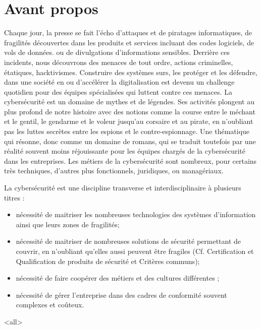 
\section{Avant propos }

Chaque jour, la presse se fait l'écho d'attaques et de piratages informatiques, de fragilités découvertes dans les produits et services incluant des codes logiciels, de vols de données. ou de divulgations d'informations sensibles.
Derrière ces incidents, nous découvrons des menaces de tout ordre, actions criminelles, étatiques, hacktivismes. Construire des systèmes surs, les protéger et les défendre, dans une société en ou d'accélérer la digitalisation est devenu un challenge quotidien pour des équipes spécialisées qui luttent contre ces menaces. 
La cybersécurité est un domaine de mythes et de légendes. Ses activités plongent au plus profond de notre histoire avec des notions comme la course entre le méchant et le gentil, le gendarme et le voleur jusqu'au corsaire et au pirate, en n'oubliant pas les luttes secrètes entre les espions et le contre-espionnage. Une thématique qui résonne, donc comme un domaine de romans, qui se traduit toutefois par une réalité souvent moins réjouissante pour les équipes chargés de la cybersécurité dans les entreprises. Les métiers de la cybersécurité sont nombreux, pour certains très techniques, d'autres plus fonctionnels, juridiques, ou managériaux. 

La cybersécurité est une discipline transverse et interdisciplinaire à plusieurs titres :
\begin{itemize}
  \item nécessité de maitriser les nombreuses technologies des systèmes d'information ainsi que leurs zones de fragilités;
  \item nécessité de maitriser de nombreuses solutions de sécurité permettant de couvrir, en n'oubliant qu'elles aussi peuvent être fragiles (Cf. Certification et Qualification de produits de sécurité et Critères communs);
  \item nécessité de faire coopérer des métiers et des cultures différentes ;
  \item nécessité de gérer l'entreprise dans des cadres de conformité souvent complexes et coûteux.
\end{itemize}


\mode<all>{}

